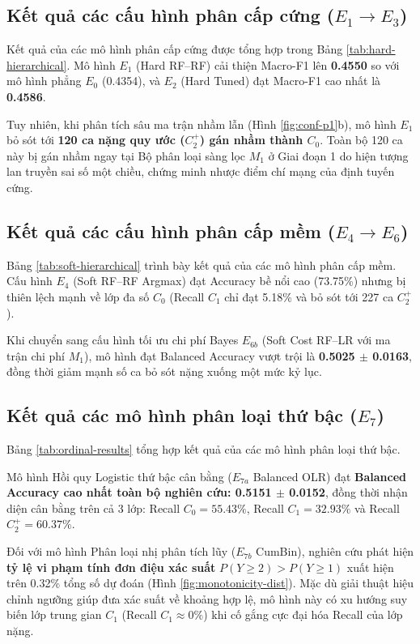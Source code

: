 \subsection{Kết quả các cấu hình phân cấp cứng ($E_1 \to E_3$)}
Kết quả của các mô hình phân cấp cứng được tổng hợp trong Bảng \ref{tab:hard-hierarchical}. Mô hình $E_1$ (Hard RF--RF) cải thiện Macro-F1 lên \textbf{0.4550} so với mô hình phẳng $E_0$ (0.4354), và $E_2$ (Hard Tuned) đạt Macro-F1 cao nhất là \textbf{0.4586}. 



Tuy nhiên, khi phân tích sâu ma trận nhầm lẫn (Hình \ref{fig:conf-p1}b), mô hình $E_1$ bỏ sót tới \textbf{120 ca nặng quy ước ($C_2^+$) gán nhầm thành $C_0$}. Toàn bộ 120 ca này bị gán nhầm ngay tại Bộ phân loại sàng lọc $M_1$ ở Giai đoạn 1 do hiện tượng lan truyền sai số một chiều, chứng minh nhược điểm chí mạng của định tuyến cứng.

\subsection{Kết quả các cấu hình phân cấp mềm ($E_4 \to E_6$)}
Bảng \ref{tab:soft-hierarchical} trình bày kết quả của các mô hình phân cấp mềm. Cấu hình $E_4$ (Soft RF--RF Argmax) đạt Accuracy bề nổi cao (73.75\%) nhưng bị thiên lệch mạnh về lớp đa số $C_0$ (Recall $C_1$ chỉ đạt 5.18\% và bỏ sót tới 227 ca $C_2^+$).



Khi chuyển sang cấu hình tối ưu chi phí Bayes $E_{6b}$ (Soft Cost RF--LR với ma trận chi phí $M_1$), mô hình đạt Balanced Accuracy vượt trội là \textbf{0.5025 $\pm$ 0.0163}, đồng thời giảm mạnh số ca bỏ sót nặng xuống một mức kỷ lục.

\subsection{Kết quả các mô hình phân loại thứ bậc ($E_7$)}
Bảng \ref{tab:ordinal-results} tổng hợp kết quả của các mô hình phân loại thứ bậc.



Mô hình Hồi quy Logistic thứ bậc cân bằng ($E_{7a}$ Balanced OLR) đạt \textbf{Balanced Accuracy cao nhất toàn bộ nghiên cứu: 0.5151 $\pm$ 0.0152}, đồng thời nhận diện cân bằng trên cả 3 lớp: Recall $C_0 = 55.43\%$, Recall $C_1 = 32.93\%$ và Recall $C_2^+ = 60.37\%$.

Đối với mô hình Phân loại nhị phân tích lũy ($E_{7b}$ CumBin), nghiên cứu phát hiện \textbf{tỷ lệ vi phạm tính đơn điệu xác suất} $P(Y \ge 2) > P(Y \ge 1)$ xuất hiện trên 0.32\% tổng số dự đoán (Hình \ref{fig:monotonicity-dist}). Mặc dù giải thuật hiệu chỉnh ngưỡng giúp đưa xác suất về khoảng hợp lệ, mô hình này có xu hướng suy biến lớp trung gian $C_1$ (Recall $C_1 \approx 0\%$) khi cố gắng cực đại hóa Recall của lớp nặng.

